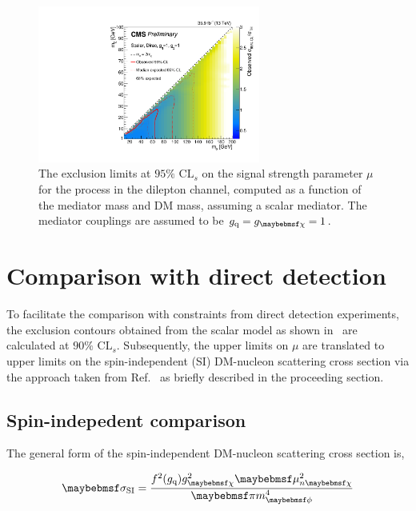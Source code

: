\begin{figure}
  \centering
  \includegraphics[width=0.65\textwidth]{figs/dilept_inc_S_limits2D_NLO.pdf}
  \caption{The exclusion limits at $95\%$ $\textrm{CL}_{s}$ on the signal strength parameter $\mu$ for the \ttDM process in the dilepton channel, computed as a function of the mediator mass and DM mass, assuming a scalar mediator. The mediator couplings are assumed to be $\gq=\gDM=1$.}
  \label{fig:2Dexclusion}
\end{figure}

\clearpage 

\section{Comparison with direct detection}
\label{sec:comparetoDD}

To facilitate the comparison with constraints from direct detection experiments, the exclusion contours obtained from the scalar \ttDM model as shown in~ are calculated at $90\%$ $\textrm{CL}_{s}$. Subsequently, the upper limits on $\mu$ are translated to upper limits on the spin-independent (SI) DM-nucleon scattering cross section via the approach taken from Ref.~\cite{Boveia:2016mrp} as briefly described in the proceeding section.

\subsection{Spin-indepedent comparison}
\label{subsec:SIcase}

The general form of the spin-independent DM-nucleon scattering cross section is,

\begin{equation}
  \sigma_{\textrm{SI}} = \frac{f^{2}(\gq)\gDM^{2}\mu_{n\chi}^2}{\pi\mMed^{4}}
  \label{eq:DDtranslation}
\end{equation}

